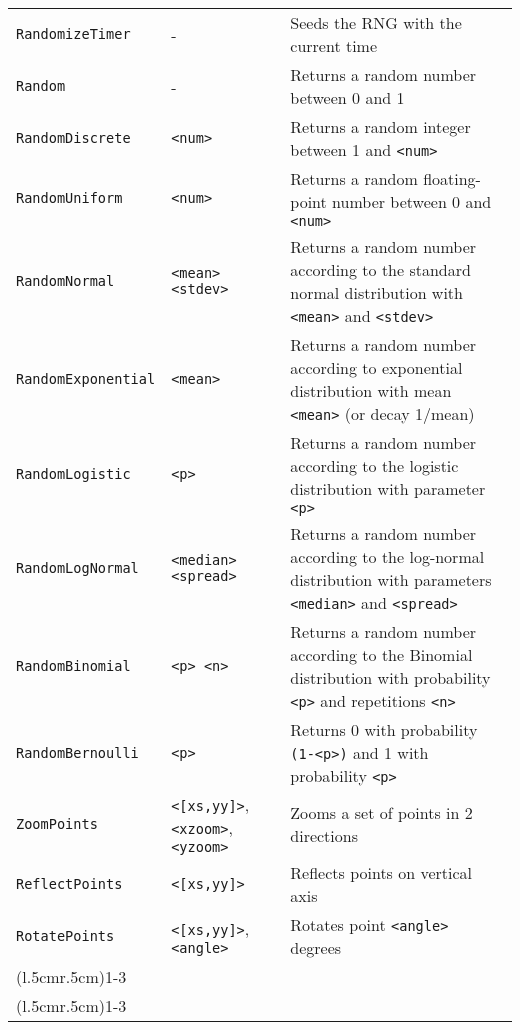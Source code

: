 \begin{longtable}{p{3cm}p{3cm}p{6cm}}
\verb+RandomizeTimer+ & - & Seeds the RNG with the current time\\ 
\verb+Random+ & - & Returns a random number between 0 and 1\\ 
\verb+RandomDiscrete+ &\verb+<num>+ &Returns a random integer between 1 and \verb+<num>+ \\ 
\verb+RandomUniform+ &\verb+<num>+ &Returns a random floating-point number between 0 and \verb+<num>+ \\ 
\verb+RandomNormal+ &\verb+<mean> <stdev>+ &Returns a random number according to the standard normal distribution with \verb+<mean>+ and \verb+<stdev>+\\ 
\verb+RandomExponential+ &\verb+<mean>+ &Returns a random number according to exponential distribution with mean \verb+<mean>+ (or decay 1/mean)\\ 
\verb+RandomLogistic+ &\verb+<p>+ &Returns a random number according to the logistic distribution with parameter \verb+<p>+\\ 
\verb+RandomLogNormal+ &\verb+<median> <spread>+ &Returns a random number according to the log-normal distribution with parameters \verb+<median>+ and \verb+<spread>+\\ 
\verb+RandomBinomial+ &\verb+<p> <n>+&Returns a random number according to the Binomial distribution with probability \verb+<p>+ and repetitions \verb+<n>+\\ 
\verb+RandomBernoulli+ &\verb+<p>+ &Returns 0 with probability \verb+(1-<p>)+ and 1 with probability \verb+<p>+\\ 

\verb+ZoomPoints+
&\verb+<[xs,yy]>+, \verb+<xzoom>+, \verb+<yzoom>+&Zooms a set of points in 2 directions\\
\verb+ReflectPoints+&\verb+<[xs,yy]>+&Reflects points on vertical axis\\
\verb+RotatePoints+ &\verb+<[xs,yy]>+,\verb+<angle>+&Rotates point \verb+<angle>+ degrees\\
\addlinespace[0.2cm] 

\cmidrule(l{.5cm}r{.5cm}){1-3} 
\multicolumn{3}{c}{\textbf{File/NetworkStream Functions}}\\ 
\cmidrule(l{.5cm}r{.5cm}){1-3} 


\end{longtable}
